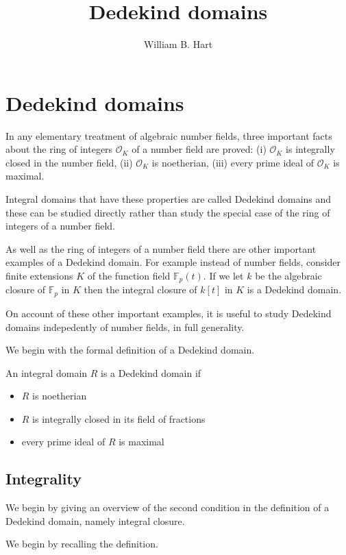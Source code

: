 \documentclass[10pt]{article}
\title{Dedekind domains}
\author{
William B. Hart
}
\newcommand{\Op}{\mathcal{O}}
\newenvironment{definition}[1][Definition]{\begin{trivlist}
\item[\hskip \labelsep {\bfseries #1}]}{\end{trivlist}}
\begin{document}
\maketitle

\section{Dedekind domains}

In any elementary treatment of algebraic number fields, three important facts about the ring of integers $\Op_K$ of a number field are proved: (i) $\Op_K$ is integrally closed in the number field, (ii) $\Op_K$ is noetherian, (iii) every prime ideal of $\Op_K$ is maximal.

Integral domains that have these properties are called Dedekind domains and these can be studied directly rather than study the special case of the ring of integers of a number field.

As well as the ring of integers of a number field there are other important examples of a Dedekind domain. For example instead of number fields, consider finite extensions $K$ of the function field $\mathbb{F}_p(t)$. If we let $k$ be the algebraic closure of $\mathbb{F}_p$ in $K$ then the integral closure of $k[t]$ in $K$ is a Dedekind domain.

On account of these other important examples, it is useful to study Dedekind domains indepedently of number fields, in full generality.

We begin with the formal definition of a Dedekind domain.

\begin{definition}
An integral domain $R$ is a Dedekind domain if
\begin{itemize}
\item $R$ is noetherian
\item $R$ is integrally closed in its field of fractions
\item every prime ideal of $R$ is maximal
\end{itemize}
\end{definition}

\subsection{Integrality}

We begin by giving an overview of the second condition in the definition of a Dedekind domain, namely integral closure.

We begin by recalling the definition.
\end{document}
